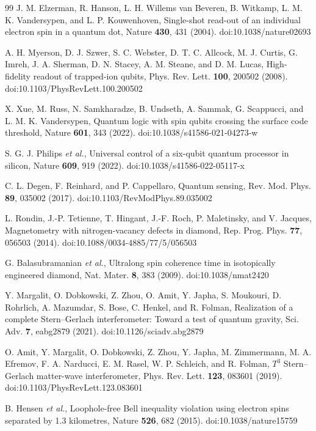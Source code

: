 \begin{thebibliography}{99}
 J. M. Elzerman, R. Hanson, L. H. Willems van Beveren, B. Witkamp, L. M. K. Vandersypen, and L. P. Kouwenhoven, Single-shot read-out of an individual electron spin in a quantum dot, Nature \textbf{430}, 431 (2004). doi:10.1038/nature02693

 A. H. Myerson, D. J. Szwer, S. C. Webster, D. T. C. Allcock, M. J. Curtis, G. Imreh, J. A. Sherman, D. N. Stacey, A. M. Steane, and D. M. Lucas, High-fidelity readout of trapped-ion qubits, Phys. Rev. Lett. \textbf{100}, 200502 (2008). doi:10.1103/PhysRevLett.100.200502

 X. Xue, M. Russ, N. Samkharadze, B. Undseth, A. Sammak, G. Scappucci, and L. M. K. Vandersypen, Quantum logic with spin qubits crossing the surface code threshold, Nature \textbf{601}, 343 (2022). doi:10.1038/s41586-021-04273-w

 S. G. J. Philips \emph{et al.}, Universal control of a six-qubit quantum processor in silicon, Nature \textbf{609}, 919 (2022). doi:10.1038/s41586-022-05117-x

 C. L. Degen, F. Reinhard, and P. Cappellaro, Quantum sensing, Rev. Mod. Phys. \textbf{89}, 035002 (2017). doi:10.1103/RevModPhys.89.035002

 L. Rondin, J.-P. Tetienne, T. Hingant, J.-F. Roch, P. Maletinsky, and V. Jacques, Magnetometry with nitrogen-vacancy defects in diamond, Rep. Prog. Phys. \textbf{77}, 056503 (2014). doi:10.1088/0034-4885/77/5/056503

 G. Balasubramanian \emph{et al.}, Ultralong spin coherence time in isotopically engineered diamond, Nat. Mater. \textbf{8}, 383 (2009). doi:10.1038/nmat2420

 Y. Margalit, O. Dobkowski, Z. Zhou, O. Amit, Y. Japha, S. Moukouri, D. Rohrlich, A. Mazumdar, S. Bose, C. Henkel, and R. Folman, Realization of a complete Stern--Gerlach interferometer: Toward a test of quantum gravity, Sci. Adv. \textbf{7}, eabg2879 (2021). doi:10.1126/sciadv.abg2879

 O. Amit, Y. Margalit, O. Dobkowski, Z. Zhou, Y. Japha, M. Zimmermann, M. A. Efremov, F. A. Narducci, E. M. Rasel, W. P. Schleich, and R. Folman, $T^3$ Stern--Gerlach matter-wave interferometer, Phys. Rev. Lett. \textbf{123}, 083601 (2019). doi:10.1103/PhysRevLett.123.083601

 B. Hensen \emph{et al.}, Loophole-free Bell inequality violation using electron spins separated by 1.3 kilometres, Nature \textbf{526}, 682 (2015). doi:10.1038/nature15759


\end{thebibliography}
